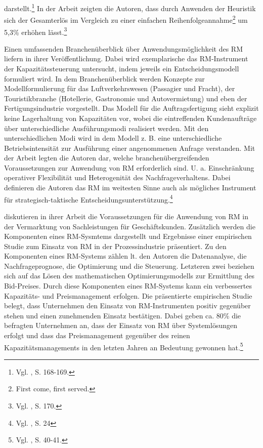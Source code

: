 darstellt.\footnote{Vgl. \cite{Spengler:2007aa}, S. 168-169.} In der Arbeit zeigten die Autoren, dass durch Anwenden der Heuristik sich der Gesamterlös im Vergleich zu einer einfachen Reihenfolgeannahme\footnote{\glqq First come, first served.\grqq} um 5,3\% erhöhen lässt.\footnote{Vgl. \cite{Spengler:2007aa}, S. 170.}

Einen umfassenden Branchenüberblick über Anwendungsmöglichkeit des RM liefern \cite{kimms2005branchenverg} in ihrer Veröffentlichung. Dabei wird exemplarische das RM-Instrument der Kapazitätssteuerung untersucht, indem jeweils ein Entscheidungsmodell formuliert wird. In dem Branchenüberblick werden Konzepte zur Modellformulierung für das Luftverkehrswesen (Passagier und Fracht), der Touristikbranche (Hotellerie, Gastronomie und Autovermietung) und eben der Fertigungsindustrie vorgestellt. Das Modell für die Auftragsfertigung sieht explizit keine Lagerhaltung von Kapazitäten vor, wobei die eintreffenden Kundenaufträge über unterschiedliche Ausführungsmodi realisiert werden. Mit den unterschiedlichen Modi wird in dem Modell z. B. eine unterschiedliche Betriebsintensität zur Ausführung einer angenommenen Anfrage verstanden. Mit der Arbeit legten die Autoren dar, welche branchenübergreifenden Voraussetzungen zur Anwendung von RM erforderlich sind. U. a. Einschränkung operativer Flexibilität und Heterogenität des Nachfrageverhaltens. Dabei definieren die Autoren das RM im weitesten Sinne auch als mögliches Instrument für strategisch-taktische Entscheidungsunterstützung.\footnote{Vgl. \cite{kimms2005branchenverg}, S. 24} 

\cite{kolisch2006revenue} diskutieren in ihrer Arbeit die Voraussetzungen für die Anwendung von RM in der Vermarktung von Sachleistungen für Geschäftskunden. Zusätzlich werden die Komponenten eines RM-Sysmtems dargestellt und Ergebnisse einer empirischen Studie zum Einsatz von RM in der Prozessindustrie präsentiert. Zu den Komponenten eines RM-Systems zählen lt. den Autoren die Datenanalyse, die Nachfrageprognose, die Optimierung und die Steuerung. Letzteren zwei beziehen sich auf das Lösen des mathematischen Optimierungsmodells zur Ermittlung des Bid-Preises. Durch diese Komponenten eines RM-Systems kann ein verbessertes Kapazitäts- und Preismanagement erfolgen. Die präsentierte empirischen Studie belegt, dass Unternehmen den Einsatz von RM-Instrumenten positiv gegenüber stehen und einen zunehmenden Einsatz bestätigen. Dabei geben ca. 80\% die befragten Unternehmen an, dass der Einsatz von RM über Systemlösungen erfolgt und dass das Preismanagement gegenüber des reinen Kapazitätsmanagements in den letzten Jahren an Bedeutung gewonnen hat.\footnote{Vgl. \cite{kolisch2006revenue}, S. 40-41.}

